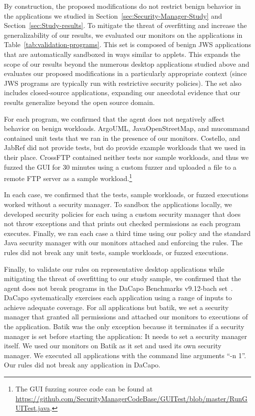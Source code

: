 \documentclass{sig-alternate}
\newcommand{\clg}[1]{\todo[color=yellow]{CLG: #1}}
\begin{document}
By construction, the proposed modifications do not restrict
benign behavior in the applications we studied in
Section~\ref{sec:Security-Manager-Study} and Section~\ref{sec:Study-results}.
To mitigate the threat of overfitting and increase the generalizability of our results, we 
evaluated our monitors on the applications
in Table~\ref{tab:validation-programs}. This set is composed of benign JWS
applications that are automatically sandboxed in ways similar to applets.  This
expands the scope of our results beyond the numerous desktop applications
studied above and evaluates our proposed modifications in a particularly
appropriate context (since JWS programs are typically run with restrictive
security policies).  The set also includes closed-source applications,
expanding our anecdotal evidence that our results generalize beyond the open
source domain.

For each program, we confirmed that the agent does not negatively affect
behavior on benign workloads. ArgoUML, JavaOpenStreetMap, and mucommand 
contained unit tests that we ran in the presence of our monitors. Costello, and
JabRef did not provide tests, but do provide example workloads that we used
in their place. CrossFTP contained neither tests nor sample workloads, and thus
we fuzzed the GUI for 30 minutes using a custom fuzzer and uploaded a file to a
remote FTP server as a sample workload.\footnote{The GUI fuzzing source code can
  be found at
  \url{https://github.com/SecurityManagerCodeBase/GUITest/blob/master/RunGUITest.java}.} 

In each case, we confirmed that the tests, sample workloads, or fuzzed executions
worked without a security manager. To sandbox the applications locally,\clg{I
  don't understand this.  Can we rephrase?}
we developed security policies for each using a custom security manager that does not throw exceptions 
and that prints out checked permissions as each program executes. Finally, we
ran each case a third time 
using our policy and the standard Java security manager with our monitors
attached and enforcing the rules. The rules did not break any unit tests, sample
workloads, or fuzzed executions.

Finally, to validate our rules on representative desktop applications while
mitigating the threat of overfitting to our study sample, we confirmed that the
agent does not break programs in the DaCapo Benchmarks v9.12-bach set~\cite{dacapo}. 
DaCapo systematically exercises each application using a range of inputs to achieve
adequate coverage. For all
applications but batik, we set a security manager that granted all
permissions and attached our monitors to executions of the application. Batik was the only
exception because it terminates if a security manager is set before starting the application: It needs to set a security manager itself. We used our monitors on Batik as it set and used its
own security manager. We executed all applications with the command line arguments ``-n 1''. 
Our rules did not break any application in DaCapo.
\end{document}

